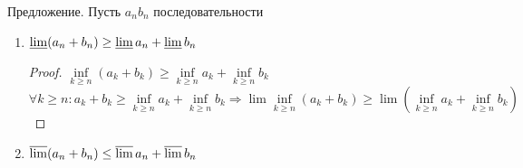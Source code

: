 Предложение. Пусть $ a_n b_n $ последовательности
\begin{enumerate}
	\item $ \varliminf(a_n + b_n) \geq \varliminf a_n + \varliminf b_n $ 
	\begin{proof}
		$ \inf\limits_{k \geq n} (a_k + b_k) \geq  \inf\limits_{k \geq n} a_k +  \inf\limits_{k \geq n} b_k $ \\
		$ \forall k \geq n : a_k + b_k \geq  \inf\limits_{k \geq n} a_k +  \inf\limits_{k \geq n} b_k \Rightarrow \lim\inf\limits_{k \geq n} (a_k + b_k ) \geq \lim( \inf\limits_{k \geq n} a_k +  \inf\limits_{k \geq n} b_k) $\\
	\end{proof}
	\item $ \varlimsup(a_n+b_n) \leq \varlimsup a_n + \varlimsup b_n $ 
\end{enumerate}


